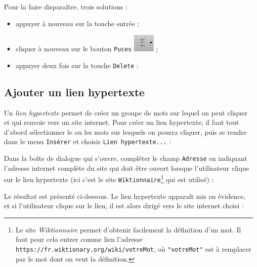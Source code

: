 Pour la faire disparaître, trois solutions :
\begin{itemize}
\item appuyer à nouveau sur la touche entrée ;
\item cliquer à nouveau sur le bouton \texttt{Puces} \includegraphics[width=.6cm]{./images/texte02/listePucesIcone} ;
\item appuyer deux fois sur la touche \texttt{Delete} :

\end{itemize}






\subsection{Ajouter un lien hypertexte}\label{Texte2LienHyper}

Un \emph{lien hypertexte} permet de créer un groupe de mots sur lequel on peut cliquer et qui renvoie vers un site internet. Pour créer un lien hypertexte, il faut tout d'abord sélectionner le ou les mots sur lesquels on pourra cliquer, puis se rendre dans le menu \texttt{Insérer} et choisir \texttt{Lien hypertexte...} :    


Dans la boîte de dialogue qui s'ouvre, compléter le champ \texttt{Adresse} en indiquant l'adresse internet complète du site qui doit être ouvert lorsque l'utilisateur clique sur le lien hypertexte (ici c'est le site \texttt{Wiktionnaire}\footnote{Le site \emph{Wiktionnaire} permet d'obtenir facilement la définition d'un mot. Il faut pour cela entrer comme lien l'adresse \texttt{https://fr.wiktionary.org/wiki/votreMot}, où \texttt{"votreMot"} est à remplacer par le mot dont on veut la définition.} qui est utilisé) :   


Le résultat est présenté ci-dessous. Le lien hypertexte apparaît mis en évidence, et si l'utilisateur clique sur le lien, il est alors dirigé vers le site internet choisi :





